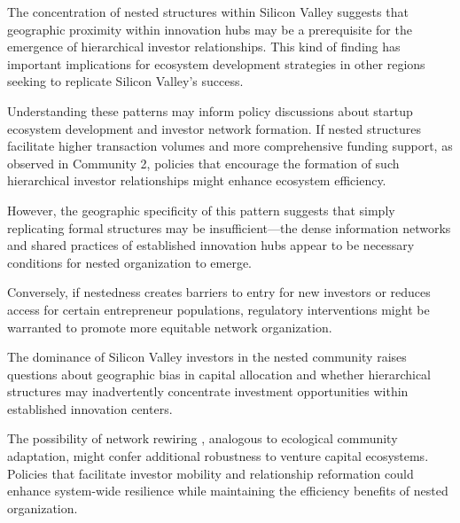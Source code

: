 The concentration of nested structures within Silicon Valley suggests that geographic proximity within innovation hubs may be a prerequisite for the emergence of hierarchical investor relationships. This kind of finding has important implications for ecosystem development strategies in other regions seeking to replicate Silicon Valley's success. 

Understanding these patterns may inform policy discussions about startup ecosystem development and investor network formation. If nested structures facilitate higher transaction volumes and more comprehensive funding support, as observed in Community 2, policies that encourage the formation of such hierarchical investor relationships might enhance ecosystem efficiency. 

However, the geographic specificity of this pattern suggests that simply replicating formal structures may be insufficient—the dense information networks and shared practices of established innovation hubs appear to be necessary conditions for nested organization to emerge.

Conversely, if nestedness creates barriers to entry for new investors or reduces access for certain entrepreneur populations, regulatory interventions might be warranted to promote more equitable network organization. 

The dominance of Silicon Valley investors in the nested community raises questions about geographic bias in capital allocation and whether hierarchical structures may inadvertently concentrate investment opportunities within established innovation centers.

The possibility of network rewiring , analogous to ecological community adaptation, might confer additional robustness to venture capital ecosystems. Policies that facilitate investor mobility and relationship reformation could enhance system-wide resilience while maintaining the efficiency benefits of nested organization.




